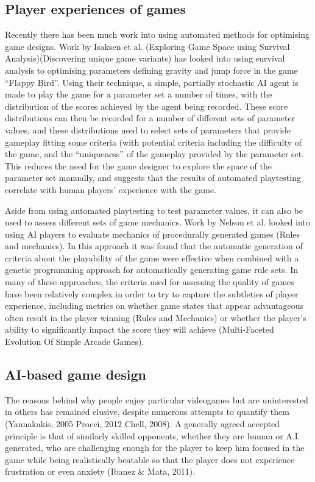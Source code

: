 \subsection{Player experiences of games}

Recently there has been much work into using automated methods for optimising game designs. Work by Isaksen et al. (Exploring Game Space using Survival Analysis)(Discovering unique game variants) has looked into using survival analysis to optimising parameters defining gravity and jump force in the game “Flappy Bird”. Using their technique, a simple, partially stochastic AI agent is made to play the game for a parameter set a number of times, with the distribution of the scores achieved by the agent being recorded. These score distributions can then be recorded for a number of different sets of parameter values, and these distributions used to select sets of parameters that provide gameplay fitting some criteria (with potential criteria including the difficulty of the game, and the “uniqueness” of the gameplay provided by the parameter set. This reduces the need for the game designer to explore the space of the parameter set manually, and suggests that the results of automated playtesting correlate with human players' experience with the game.

Aside from using automated playtesting to test parameter values, it can also be used to assess different sets of game mechanics. Work by Nelson et al. looked into using AI players to evaluate mechanics of procedurally generated games (Rules and mechanics). In this approach it was found that the automatic generation of criteria about the playability of the game were effective when combined with a genetic programming approach for automatically generating game rule sets. In many of these approaches, the criteria used for assessing the quality of games have been relatively complex in order to try to capture the subtleties of player experience, including metrics on whether game states that appear advantageous often result in the player winning (Rules and Mechanics) or whether the player's ability to significantly impact the score they will achieve (Multi-Faceted Evolution Of Simple Arcade Games).

\subsection{AI-based game design}

The reasons behind why people enjoy particular videogames but are uninterested in others has remained elusive, despite numerous attempts to quantify them (Yannakakis, 2005 Procci, 2012 Chell, 2008). A generally agreed accepted principle is that of similarly skilled opponents, whether they are human or A.I. generated, who are challenging enough for the player to keep him focused in the game while being realistically beatable so that the player does not experience frustration or even anxiety (Ibanez \& Mata, 2011).

